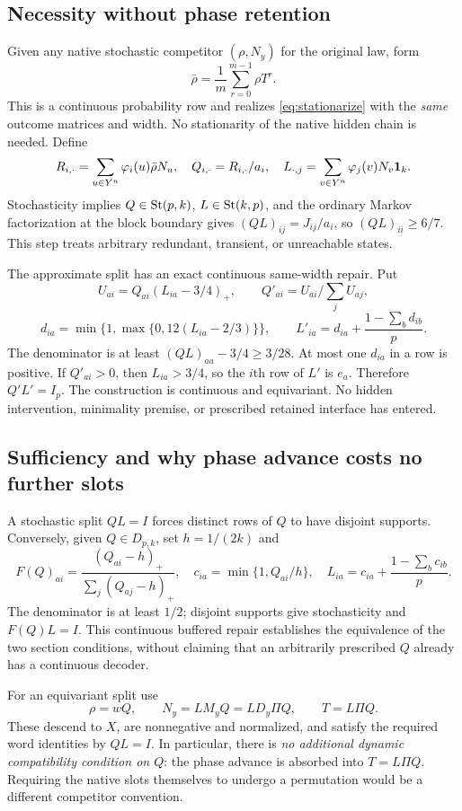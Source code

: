 \documentclass[11pt]{article}
\theoremstyle{remark}\newtheorem{remark}[theorem]{Remark}
\begin{document}
\subsection{Necessity without phase retention}
Given any native stochastic competitor $(\rho,N_y)$ for the original law, form
\[
\bar\rho=\frac1m\sum_{r=0}^{m-1}\rho T^r.
\]
This is a continuous probability row and realizes \eqref{eq:stationarize} with the \emph{same} outcome matrices and width. No stationarity of the native hidden chain is needed. Define
\[
R_{i,\cdot}=\sum_{u\in Y^n}\varphi_i(u)\bar\rho N_u,
\quad Q_{i,\cdot}=R_{i,\cdot}/a_i,
\quad L_{\cdot,j}=\sum_{v\in Y^n}\varphi_j(v)N_v\mathbf1_k.
\]
Stochasticity implies $Q\in\operatorname{St}(p,k)$, $L\in\operatorname{St}(k,p)$, and the ordinary Markov factorization at the block boundary gives $(QL)_{ij}=J_{ij}/a_i$, so $(QL)_{ii}\geq6/7$. This step treats arbitrary redundant, transient, or unreachable states.

The approximate split has an exact continuous same-width repair. Put
\[
U_{ai}=Q_{ai}(L_{ia}-3/4)_+,\qquad Q'_{ai}=U_{ai}/\sum_jU_{aj},
\]
\[
d_{ia}=\min\{1,\max\{0,12(L_{ia}-2/3)\}\},\qquad
L'_{ia}=d_{ia}+\frac{1-\sum_b d_{ib}}p.
\]
The denominator is at least $(QL)_{aa}-3/4\geq3/28$. At most one $d_{ia}$ in a row is positive. If $Q'_{ai}>0$, then $L_{ia}>3/4$, so the $i$th row of $L'$ is $e_a$. Therefore $Q'L'=I_p$. The construction is continuous and equivariant. No hidden intervention, minimality premise, or prescribed retained interface has entered.

\subsection{Sufficiency and why phase advance costs no further slots}
A stochastic split $QL=I$ forces distinct rows of $Q$ to have disjoint supports. Conversely, given $Q\in D_{p,k}$, set $h=1/(2k)$ and
\[
F(Q)_{ai}=\frac{(Q_{ai}-h)_+}{\sum_j(Q_{aj}-h)_+},\quad
c_{ia}=\min\{1,Q_{ai}/h\},\quad
L_{ia}=c_{ia}+\frac{1-\sum_b c_{ib}}p.
\]
The denominator is at least $1/2$; disjoint supports give stochasticity and $F(Q)L=I$. This continuous buffered repair establishes the equivalence of the two section conditions, without claiming that an arbitrarily prescribed $Q$ already has a continuous decoder.

For an equivariant split use
\begin{equation}\label{eq:lift}
\rho=wQ,\qquad N_y=LM_yQ=LD_y\Pi Q,\qquad T=L\Pi Q.
\end{equation}
These descend to $X$, are nonnegative and normalized, and satisfy the required word identities by $QL=I$. In particular, there is \emph{no additional dynamic compatibility condition on $Q$}: the phase advance is absorbed into $T=L\Pi Q$. Requiring the native slots themselves to undergo a permutation would be a different competitor convention.
\end{document}
